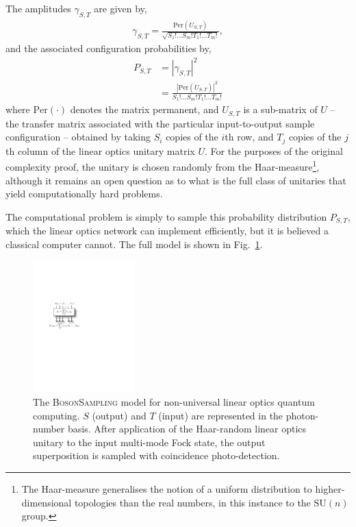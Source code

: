 The amplitudes $\gamma_{S,T}$ are given by,
\begin{align}
	\gamma_{S,T} = \frac{\mathrm{Per}(U_{S,T})}{\sqrt{S_1!\dots S_m! T_1!\dots T_m!}},
\end{align}
and the associated configuration probabilities by,
\begin{align}
	P_{S,T} &= |\gamma_{S,T}|^2 \nonumber \\
	&= \frac{|\mathrm{Per}(U_{S,T})|^2}{S_1!\dots S_m! T_1!\dots T_m!}
\end{align}
where $\mathrm{Per}(\cdot)$ denotes the matrix permanent, and $U_{S,T}$ is a sub-matrix of $U$ -- the transfer matrix associated with the particular input-to-output sample configuration -- obtained by taking $S_i$ copies of the $i$th row, and $T_j$ copies of the $j$th column of the linear optics unitary matrix $U$. For the purposes of the original complexity proof, the unitary is chosen randomly from the Haar-measure\footnote{The Haar-measure generalises the notion of a uniform distribution to higher-dimensional topologies than the real numbers, in this instance to the $\mathrm{SU}(n)$ group.}, although it remains an open question as to what is the full class of unitaries that yield computationally hard problems.

The computational problem is simply to sample this probability distribution $P_{S,T}$, which the linear optics network can implement efficiently, but it is believed a classical computer cannot. The full model is shown in Fig.~\ref{fig:bs_model}.

\begin{figure}[htpb]
\includegraphics[width=0.35\textwidth]{bs_model}
\caption{The \textsc{BosonSampling} model for non-universal linear optics quantum computing. $S$ (output) and $T$ (input) are represented in the photon-number basis. After application of the Haar-random linear optics unitary to the input multi-mode Fock state, the output superposition is sampled with coincidence photo-detection.} \label{fig:bs_model}
\end{figure}

